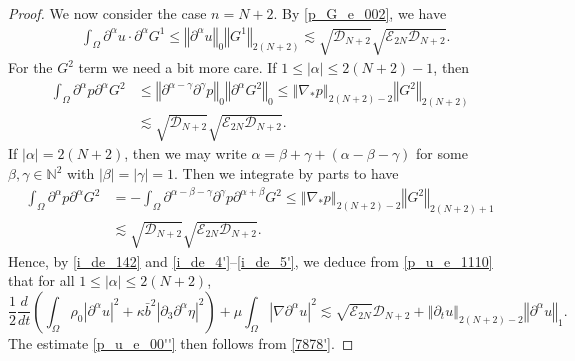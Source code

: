 \documentclass[a4paper,reqno,11pt]{amsart}
\numberwithin{equation}{section}
\providecommand{\abs}[1]{\left\vert#1\right\vert}
\providecommand{\norm}[1]{\left\Vert#1\right\Vert}
\providecommand{\sd}[1]{\mathcal{D}_{#1}}
\providecommand{\se}[1]{\mathcal{E}_{#1}}
\providecommand{\norm}[1]{\left\Vert#1\right\Vert}
\begin{document}
\begin{proof}
We now consider the case $n=N+2$. By \eqref{p_G_e_002}, we have
\begin{equation} \label{i_de_4'}
\begin{split}
 & \int_\Omega   {\partial}^{\alpha} u  \cdot  {\partial}^{\alpha} G^1 \le \norm{{\partial}^{\alpha} u}_0\norm{G^1}_{2(N+2)}
  {\lesssim} \sqrt{ \sd{N+2} } \sqrt{ \se{2N}\sd{N+2} } .
\end{split}
\end{equation}
For the $G^2$ term we need a bit more care. If $1\le|{\alpha}|\le 2(N+2) -1$, then
\begin{equation}\label{i_de_5'0}
\begin{split}
  \int_\Omega  {\partial}^{\alpha}   p {\partial}^{\alpha}   G^2
&\le \norm{{\partial}^{\alpha-\gamma}{\partial}^\gamma   p}_{0}  \norm{ {\partial}^{\alpha}  G^2 }_{0}
\le \norm{\nabla_\ast  p}_{2(N+2) -2}  \norm{    G^2 }_{ 2(N+2)}
  \\&{\lesssim} \sqrt{ \sd{N+2} }\sqrt{ \se{2N}\sd{N+2}}  .
\end{split}
\end{equation}
If $|{\alpha}|= 2(N+2) $,  then we may write $\alpha = \beta +\gamma+(\alpha-\beta-\gamma)$ for some $\beta,\gamma \in \mathbb{N}^2$ with $\abs{\beta}=\abs{\gamma}=1$. Then we integrate by parts to have
\begin{equation}\label{i_de_5'}
\begin{split}
  \int_\Omega  {\partial}^{\alpha} p {\partial}^{\alpha}  G^2&=-\int_\Omega  {\partial}^{{\alpha}-\beta-\gamma}{\partial}^\gamma  p {\partial}^{{\alpha}+\beta}  G^2
\le \norm{\nabla_\ast  p}_{2(N+2) -2}  \norm{  G^2 }_{2(N+2)+1 }
  \\&{\lesssim} \sqrt{ \sd{N+2} }\sqrt{ \se{2N}\sd{N+2}}  .
\end{split}
\end{equation}
Hence, by \eqref{i_de_142} and \eqref{i_de_4'}--\eqref{i_de_5'}, we deduce from \eqref{p_u_e_1110} that for all $1\le\abs{\alpha} \le 2(N+2)$,
\begin{equation} \label{7878'}
{\frac{1}{2}} \frac{d}{dt}\left(  \int_\Omega \rho_0 \abs{{\partial}^{\alpha}   u }^2  + \kappa\bar b^2\abs{{\partial}_3\partial^\alpha   \eta }^2\right)+  \mu \int_\Omega  \abs{\nabla {\partial}^{\alpha}  u }^2
{\lesssim}  \sqrt{ \se{2N}   } \sd{N+2}+\norm{{\partial_t} u}_{2(N+2)-2}\norm{{\partial}^{\alpha}   u}_{1}.
\end{equation}
The estimate \eqref{p_u_e_00''} then follows from \eqref{7878'}.
\end{proof}
\end{document}
